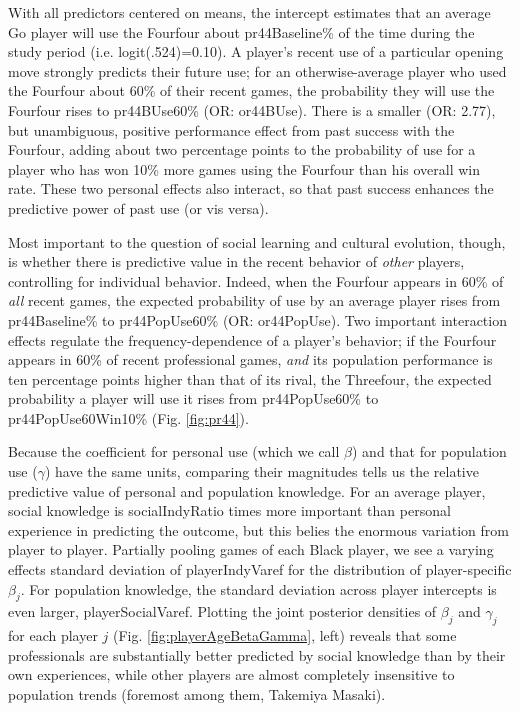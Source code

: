 \documentclass[reqno,12pt]{amsart}
\begin{document}
With all predictors centered on means, the intercept estimates that an average Go player will use the Fourfour about pr44Baseline\% of the time during the study period (i.e. logit(.524)=0.10). A player's recent use of a particular opening move strongly predicts their future use; for an otherwise-average player who used the Fourfour about 60\% of their recent games, the probability they will use the Fourfour rises to pr44BUse60\% (OR: or44BUse{}). There is a smaller (OR: 2.77), but unambiguous, positive performance effect from past success with the Fourfour, adding about two percentage points to the probability of use for a player who has won 10\% more games using the Fourfour than his overall win rate. These two personal effects also interact, so that past success enhances the predictive power of past use (or vis versa).

Most important to the question of social learning and cultural evolution, though, is whether there is predictive value in the recent behavior of \textit{other} players, controlling for individual behavior. Indeed, when the Fourfour appears in 60\% of \textit{all} recent games, the expected probability of use by an average player rises from pr44Baseline\% to pr44PopUse60\% (OR: or44PopUse). Two important interaction effects regulate the frequency-dependence of a player's behavior; if the Fourfour appears in 60\% of recent professional games, \textit{and} its population performance is ten percentage points higher than that of its rival, the Threefour, the expected probability a player will use it rises from pr44PopUse60\% to pr44PopUse60Win10\% (Fig. \ref{fig:pr44}).

Because the coefficient for personal use (which we call $\beta$) and that for population use ($\gamma$) have the same units, comparing their magnitudes tells us the relative predictive value of personal and population knowledge. For an average player, social knowledge is socialIndyRatio{} times more important than personal experience in predicting the outcome, but this belies the enormous variation from player to player. Partially pooling games of each Black player, we see a varying effects standard deviation of playerIndyVaref{} for the distribution of player-specific $\beta_j$. For population knowledge, the standard deviation across player intercepts is even larger, playerSocialVaref. Plotting the joint posterior densities of $\beta_j$ and $\gamma_j$ for each player $j$ (Fig. \ref{fig:playerAgeBetaGamma}, left) reveals that some professionals are substantially better predicted by social knowledge than by their own experiences, while other players are almost completely insensitive to population trends (foremost among them, Takemiya Masaki).
\end{document}
